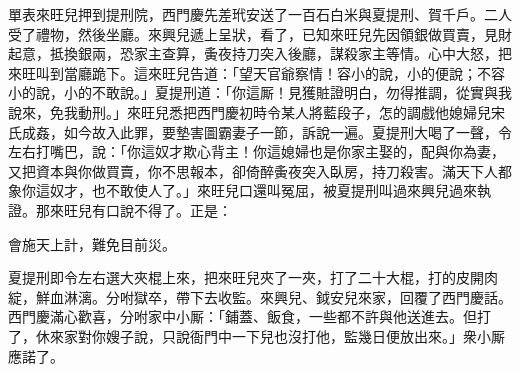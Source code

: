 單表來旺兒押到提刑院，西門慶先差玳安送了一百石白米與夏提刑、賀千戶。二人受了禮物，然後坐廳。來興兒遞上呈狀，看了，已知來旺兒先因領銀做買賣，見財起意，抵換銀兩，恐家主查算，夤夜持刀突入後廳，謀殺家主等情。心中大怒，把來旺叫到當廳跪下。這來旺兒告道：「望天官爺察情！容小的說，小的便說；不容小的說，小的不敢說。」夏提刑道：「你這厮！見獲賍證明白，勿得推調，從實與我說來，免我動刑。」來旺兒悉把西門慶初時令某人將藍段子，怎的調戲他媳婦兒宋氏成姦，如今故入此罪，要墊害圖霸妻子一節，訴說一遍。夏提刑大喝了一聲，令左右打嘴巴，說：「你這奴才欺心背主！你這媳婦也是你家主娶的，{}配與你為妻，又把資本與你做買賣，你不思報本，卻倚醉夤夜突入臥房，持刀殺害。滿天下人都象你這奴才，也不敢使人了。」來旺兒口還叫冤屈，被夏提刑叫過來興兒過來執證。那來旺兒有口說不得了。正是：

\begin{myquote}
會施天上計，難免目前災。
\end{myquote}

夏提刑即令左右選大夾棍上來，把來旺兒夾了一夾，打了二十大棍，打的皮開肉綻，鮮血淋漓。分咐獄卒，帶下去收監。來興兒、鉞安兒來家，回覆了西門慶話。西門慶滿心歡喜，分咐家中小厮：「鋪蓋、飯食，一些都不許與他送進去。但打了，休來家對你嫂子說，只說衙門中一下兒也沒打他，監幾日便放出來。」衆小厮應諾了。

